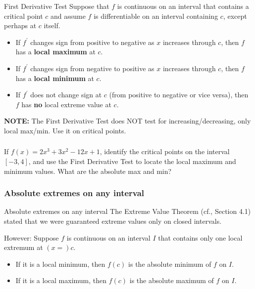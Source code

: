 \documentclass[cal1spr16Lectures.tex]{subfiles}
\begin{document}
\begin{frame}{\small First Derivative Test}
\footnotesize
Suppose that $f$ is continuous on an interval that contains a critical point $c$ and assume $f$ is differentiable on an interval containing $c$, except perhaps at $c$ itself.

\begin{itemize}
\item If $f^{\prime}$ \alert{changes sign} from positive to negative as $x$ increases through $c$, then $f$ has a {\bf local maximum} at $c$.

\vspace{0.5pc}
\item If $f^{\prime}$ \alert{changes sign} from negative to positive as $x$ increases through $c$, then $f$ has a {\bf local minimum} at $c$.

\vspace{0.5pc}
\item If $f^{\prime}$ does not change sign at $c$ (from positive to negative or vice versa), then $f$ has {\bf no} local extreme value at $c$.
\end{itemize}

\alert{{\bf NOTE:} The First Derivative Test does NOT test for increasing/decreasing, only local max/min.}  Use it on critical points. 
\end{frame}

\begin{frame}%
\frametitle{}
\begin{exe} If $f(x)=2x^3+3x^2-12x+1$, identify the critical points on the interval $[-3,4]$, and use the First Derivative Test to locate the local maximum and minimum values.  What are the absolute max and min? \end{exe}
\end{frame}

\subsubsection{Absolute extremes on any interval}

\begin{frame}{\small Absolute extremes on any interval}
\small
The Extreme Value Theorem (cf., Section 4.1) stated that we were guaranteed extreme values \alert{only on closed intervals}.  

\vspace{0.5pc}
\alert{However:}  Suppose $f$ is continuous on an interval $I$ that contains only one local extremum at $(x=)c$.

\begin{itemize}
\item If it is a local minimum, then $f(c)$ \alert{is} the absolute minimum of $f$ on $I$.

\vspace{0.5pc}
\item If it is a local maximum, then $f(c)$ \alert{is} the absolute maximum of $f$ on $I$.
\end{itemize}
\end{frame}
\end{document}
